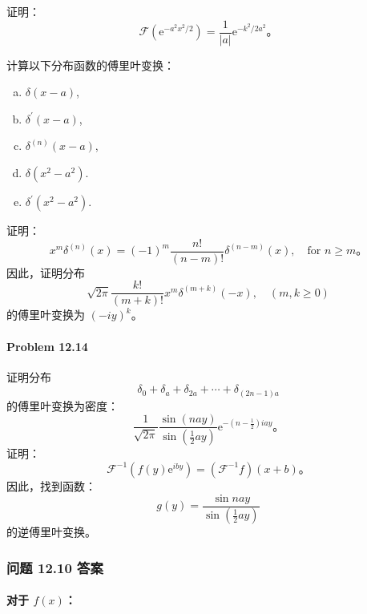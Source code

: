 \begin{problem}\label{pro:12.11}
  证明：
 $$
\mathcal{F}\left(\mathrm{e}^{-a^{2} x^{2} / 2}\right) = \frac{1}{|a|} \mathrm{e}^{-k^{2} / 2 a^{2}}。
$$
\end{problem}
\begin{problem}\label{pro:12.12}
  计算以下分布函数的傅里叶变换： 
  \begin{enumerate}[(a)]
    \item $\delta(x-a)$,
    \item $\delta^{\prime}(x-a)$,
    \item $\delta^{(n)}(x-a)$,
    \item $\delta\left(x^{2}-a^{2}\right)$.
    \item $\delta^{\prime}\left(x^{2}-a^{2}\right)$.
  \end{enumerate}
\end{problem}
\begin{problem}\label{pro:12.13}
  
证明：
$$
x^{m} \delta^{(n)}(x) = (-1)^{m} \frac{n!}{(n-m)!} \delta^{(n-m)}(x), \quad \text{for } n \geq m。
$$
因此，证明分布
$$
\sqrt{2 \pi} \frac{k!}{(m+k)!} x^{m} \delta^{(m+k)}(-x), \quad (m, k \geq 0)
$$
的傅里叶变换为 $(-i y)^{k}$。

\paragraph{Problem 12.14}\label{problem-12.14}

证明分布
$$
\delta_{0} + \delta_{a} + \delta_{2 a} + \cdots + \delta_{(2 n-1) a}
$$
的傅里叶变换为密度：
$$
\frac{1}{\sqrt{2 \pi}} \frac{\sin (n a y)}{\sin \left(\frac{1}{2} a y\right)} \mathrm{e}^{-\left(n-\frac{1}{2}\right) i a y}。
$$
证明：
$$
\mathcal{F}^{-1}\left(f(y) \mathrm{e}^{i b y}\right) = \left(\mathcal{F}^{-1} f\right)(x+b)。
$$
因此，找到函数：
$$
g(y) = \frac{\sin n a y}{\sin \left(\frac{1}{2} a y\right)}
$$
的逆傅里叶变换。
\end{problem}


\subsubsection{问题 12.10 答案}

\paragraph{\texorpdfstring{对于
$f(x)$：}{对于 f(x)：}}\label{ux5bf9ux4e8e-fx}

